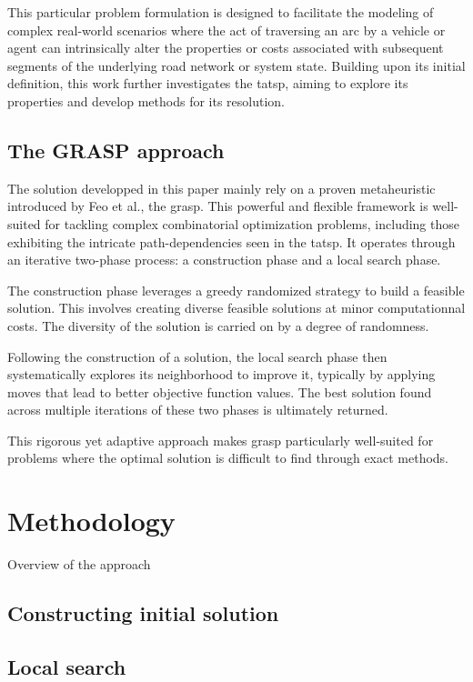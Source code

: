\documentclass[twocolumn, switch]{article} %
\begin{document}
This particular problem formulation is designed to facilitate the modeling of complex real-world scenarios where the act of 
traversing an arc by a vehicle or agent can intrinsically alter the properties or costs associated with subsequent segments of 
the underlying road network or system state. Building upon its initial definition, this work further investigates the \gls{tatsp}, 
aiming to explore its properties and develop methods for its resolution.

\subsection{The GRASP approach}

The solution developped in this paper mainly rely on a proven metaheuristic introduced by Feo et al.\cite{Feo1995}, the \gls{grasp}. 
This powerful and flexible framework is well-suited for tackling complex combinatorial optimization problems, 
including those exhibiting the intricate path-dependencies seen in the \gls{tatsp}. It operates through an iterative 
two-phase process: a construction phase and a local search phase. 

The construction phase leverages a greedy randomized strategy to build a feasible solution. This involves creating diverse feasible 
solutions at minor computationnal costs. The diversity of the solution is carried on by a degree of randomness. 

Following the construction of a solution, the local search phase then systematically explores its neighborhood to improve it, 
typically by applying moves that lead to better objective function values. The best solution found across multiple iterations of 
these two phases is ultimately returned. 

This rigorous yet adaptive approach makes \gls{grasp} particularly well-suited for problems where the optimal solution is difficult 
to find through exact methods.

\section{Methodology}
Overview of the approach 

\subsection{Constructing initial solution}
\lipsum[5]

\subsection{Local search}
\lipsum[6]
\end{document}
